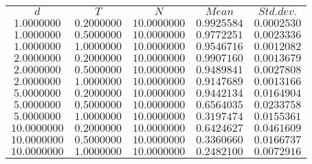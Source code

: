 \begin{tabular}{ccccc}
$d$ & $T$ & $N$ & $Mean$ & $Std. dev.$\\
$1.0000000$ & $0.2000000$ & $10.0000000$ & $0.9925584$ & $0.0002530$\\
$1.0000000$ & $0.5000000$ & $10.0000000$ & $0.9772251$ & $0.0023336$\\
$1.0000000$ & $1.0000000$ & $10.0000000$ & $0.9546716$ & $0.0012082$\\
$2.0000000$ & $0.2000000$ & $10.0000000$ & $0.9907160$ & $0.0013679$\\
$2.0000000$ & $0.5000000$ & $10.0000000$ & $0.9489841$ & $0.0027808$\\
$2.0000000$ & $1.0000000$ & $10.0000000$ & $0.9147689$ & $0.0013166$\\
$5.0000000$ & $0.2000000$ & $10.0000000$ & $0.9442134$ & $0.0164904$\\
$5.0000000$ & $0.5000000$ & $10.0000000$ & $0.6564035$ & $0.0233758$\\
$5.0000000$ & $1.0000000$ & $10.0000000$ & $0.3197474$ & $0.0155361$\\
$10.0000000$ & $0.2000000$ & $10.0000000$ & $0.6424627$ & $0.0461609$\\
$10.0000000$ & $0.5000000$ & $10.0000000$ & $0.3360660$ & $0.0166737$\\
$10.0000000$ & $1.0000000$ & $10.0000000$ & $0.2482100$ & $0.0072916$\\
\end{tabular}
